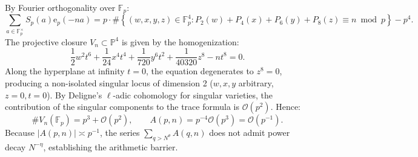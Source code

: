 \documentclass[11pt,reqno]{amsart}
\newcommand{\e}{\mathrm{e}}
\newcommand{\F}{\mathbb{F}}
\begin{document}
By Fourier orthogonality over $\F_p$:
\begin{equation}
    \sum_{a \in \F_p^\times} S_p(a) \e_p(-na) = p \cdot \#\left\{(w,x,y,z) \in \F_p^4 : P_2(w)+P_4(x)+P_6(y)+P_8(z) \equiv n \bmod p\right\} - p^4.
\end{equation}
The projective closure $V_n \subset \mathbb{P}^4$ is given by the homogenization:
\begin{equation}
    \frac{1}{2} w^2 t^6 + \frac{1}{24} x^4 t^4 + \frac{1}{720} y^6 t^2 + \frac{1}{40320} z^8 - n t^8 = 0.
\end{equation}
Along the hyperplane at infinity $t = 0$, the equation degenerates to $z^8 = 0$, producing a non-isolated singular locus of dimension 2 ($w, x, y$ arbitrary, $z = 0, t = 0$).
By Deligne's $\ell$-adic cohomology for singular varieties, the contribution of the singular components to the trace formula is $\mathcal{O}(p^2)$. Hence:
\begin{equation}
    \#V_n(\F_p) = p^3 + \mathcal{O}(p^2), \qquad A(p, n) = p^{-4} \mathcal{O}(p^3) = \mathcal{O}(p^{-1}).
\end{equation}
Because $|A(p, n)| \asymp p^{-1}$, the series $\sum_{q > N^\theta} A(q, n)$ does not admit power decay $N^{-\eta}$, establishing the arithmetic barrier.
\end{document}
